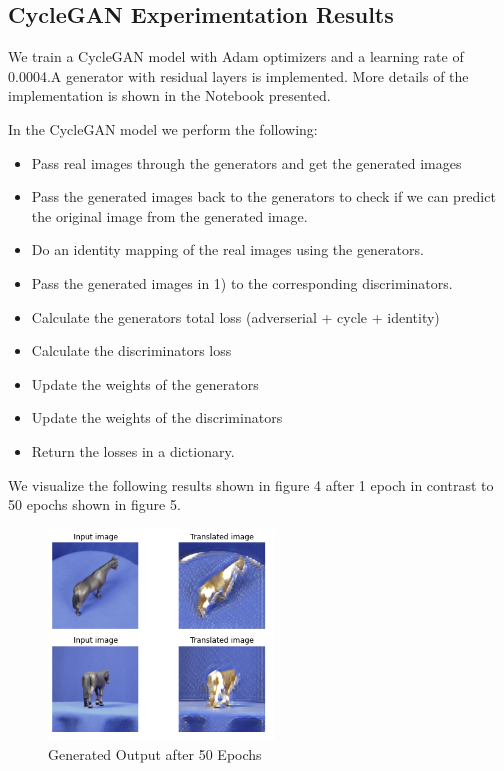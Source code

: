 \documentclass[conference]{IEEEtran}
\begin{document}
\subsection{CycleGAN Experimentation Results}
We train a CycleGAN model with Adam optimizers and a learning rate of 0.0004.A generator with residual layers is implemented. More details of the implementation is shown in the Notebook presented.

In the CycleGAN model we perform the following:
\begin{itemize}
    \item Pass real images through the generators and get the generated images
    \item Pass the generated images back to the generators to check if we can predict the original image from the generated image.
    \item Do an identity mapping of the real images using the generators.
    \item Pass the generated images in 1) to the corresponding discriminators.
    \item Calculate the generators total loss (adverserial + cycle + identity)
    \item Calculate the discriminators loss
    \item Update the weights of the generators
    \item Update the weights of the discriminators
    \item Return the losses in a dictionary.
\end{itemize}

We visualize the following results shown in figure 4 after 1 epoch in contrast to 50 epochs shown in figure 5. 

\begin{figure}[htbp]
\centerline{\includegraphics[width=60mm]{4.png}}
\caption{Generated Output after 50 Epochs}
\label{fig}
\end{figure}
\end{document}
